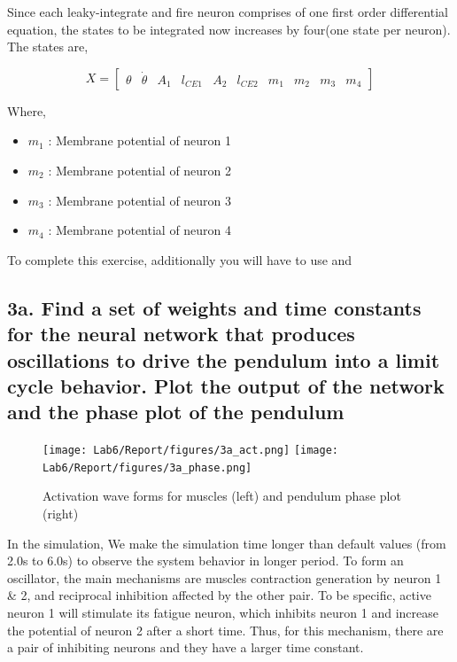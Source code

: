 \documentclass{cmc}
\begin{document}
Since each leaky-integrate and fire neuron comprises of one first
order differential equation, the states to be integrated now increases
by four(one state per neuron). The states are,


\begin{equation}
  \label{eq:1}
  X = \begin{bmatrix}
    \theta & \dot{\theta} & A_1 & l_{CE1} & A_2 & l_{CE2} & m_1 & m_2 & m_3 & m_4
  \end{bmatrix}
\end{equation}

Where,

\begin{itemize}
\item $m_1$ : Membrane potential of neuron 1
\item $m_2$ : Membrane potential of neuron 2
\item $m_3$ : Membrane potential of neuron 3
\item $m_4$ : Membrane potential of neuron 4
\end{itemize}

To complete this exercise, additionally you will have to use
 and 

\subsection*{3a. Find a set of weights and time constants for the
  neural network that produces oscillations to drive the pendulum into
  a limit cycle behavior. Plot the output of the network and the phase
  plot of the pendulum}
\label{sec:4a}

\begin{figure}[H]
  \centering
  \texttt{[image: Lab6/Report/figures/3a\_act.png]}
  \texttt{[image: Lab6/Report/figures/3a\_phase.png]}
  \caption{Activation wave forms for muscles (left) and pendulum phase plot (right)}
  \label{3a}
\end{figure}



 In the simulation, We make the simulation time longer than default values (from 2.0s to 6.0s) to observe the system behavior in longer period.
To form an oscillator, the main mechanisms are muscles contraction generation by neuron 1 & 2,
and reciprocal inhibition affected by the other pair.
 To be specific, active neuron 1 will stimulate its fatigue neuron, which inhibits neuron 1 and increase the potential of neuron 2 after a short time.
Thus, for this mechanism, there are a pair of inhibiting neurons and they have a larger time constant.
\end{document}
